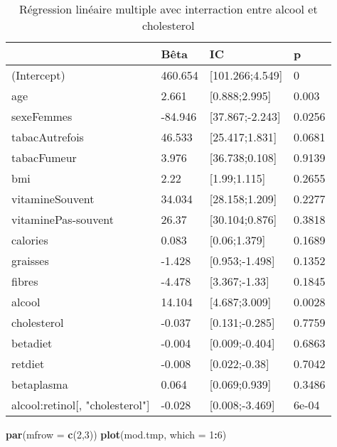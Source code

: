 \documentclass[]{article}
\newenvironment{Shaded}{\begin{snugshade}}{\end{snugshade}}
\newcommand{\KeywordTok}[1]{\textcolor[rgb]{0.13,0.29,0.53}{\textbf{#1}}}
\newcommand{\DataTypeTok}[1]{\textcolor[rgb]{0.13,0.29,0.53}{#1}}
\newcommand{\DecValTok}[1]{\textcolor[rgb]{0.00,0.00,0.81}{#1}}
\newcommand{\OperatorTok}[1]{\textcolor[rgb]{0.81,0.36,0.00}{\textbf{#1}}}
\newcommand{\NormalTok}[1]{#1}
\begin{document}
\begin{table}

\caption{\label{tab:unnamed-chunk-77}Régression linéaire multiple avec interraction entre alcool et cholesterol}
\centering
\begin{tabular}[t]{l|l|l|l}
\hline
  & Bêta & IC & p\\
\hline
\rowcolor[HTML]{BBD2E1}  (Intercept) & 460.654 & [101.266;4.549] & 0\\
\hline
age & 2.661 & [0.888;2.995] & 0.003\\
\hline
\rowcolor[HTML]{BBD2E1}  sexeFemmes & -84.946 & [37.867;-2.243] & 0.0256\\
\hline
tabacAutrefois & 46.533 & [25.417;1.831] & 0.0681\\
\hline
\rowcolor[HTML]{BBD2E1}  tabacFumeur & 3.976 & [36.738;0.108] & 0.9139\\
\hline
bmi & 2.22 & [1.99;1.115] & 0.2655\\
\hline
\rowcolor[HTML]{BBD2E1}  vitamineSouvent & 34.034 & [28.158;1.209] & 0.2277\\
\hline
vitaminePas-souvent & 26.37 & [30.104;0.876] & 0.3818\\
\hline
\rowcolor[HTML]{BBD2E1}  calories & 0.083 & [0.06;1.379] & 0.1689\\
\hline
graisses & -1.428 & [0.953;-1.498] & 0.1352\\
\hline
\rowcolor[HTML]{BBD2E1}  fibres & -4.478 & [3.367;-1.33] & 0.1845\\
\hline
alcool & 14.104 & [4.687;3.009] & 0.0028\\
\hline
\rowcolor[HTML]{BBD2E1}  cholesterol & -0.037 & [0.131;-0.285] & 0.7759\\
\hline
betadiet & -0.004 & [0.009;-0.404] & 0.6863\\
\hline
\rowcolor[HTML]{BBD2E1}  retdiet & -0.008 & [0.022;-0.38] & 0.7042\\
\hline
betaplasma & 0.064 & [0.069;0.939] & 0.3486\\
\hline
\rowcolor[HTML]{BBD2E1}  alcool:retinol[, "cholesterol"] & -0.028 & [0.008;-3.469] & 6e-04\\
\hline
\end{tabular}
\end{table}

\begin{Shaded}
\begin{Highlighting}[]
\KeywordTok{par}\NormalTok{(}\DataTypeTok{mfrow =} \KeywordTok{c}\NormalTok{(}\DecValTok{2}\NormalTok{,}\DecValTok{3}\NormalTok{))}
\KeywordTok{plot}\NormalTok{(mod.tmp, }\DataTypeTok{which =} \DecValTok{1}\OperatorTok{:}\DecValTok{6}\NormalTok{)}
\end{Highlighting}
\end{Shaded}
\end{document}

